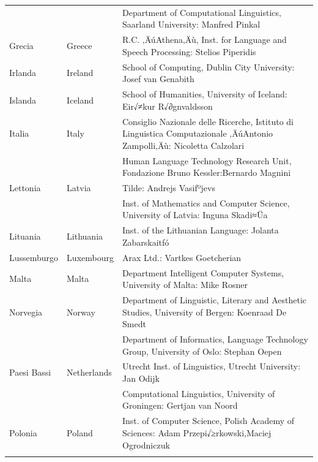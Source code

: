 \begin{longtable}{llp{110mm}}
  & & Department of Computational Linguistics, Saarland University: Manfred Pinkal\\ \addlinespace 
  Grecia & \textcolor{grey1}{Greece} & R.C. ‚ÄúAthena‚Äù, Inst. for Language and Speech Processing: Stelios Piperidis\\ \addlinespace
  Irlanda & \textcolor{grey1}{Ireland} & School of Computing, Dublin City University: Josef van Genabith\\ \addlinespace
  Islanda & \textcolor{grey1}{Iceland} & School of Humanities, University of Iceland: Eir√≠kur R√∂gnvaldsson\\ \addlinespace
  Italia & \textcolor{grey1}{Italy} & Consiglio Nazionale delle Ricerche, Istituto di Linguistica Computazionale ‚ÄúAntonio Zampolli‚Äù: Nicoletta Calzolari\\ \addlinespace
  & & Human Language Technology Research Unit, Fondazione Bruno Kessler:\newline Bernardo Magnini\\ \addlinespace 
  Lettonia & \textcolor{grey1}{Latvia} & Tilde: Andrejs Vasiƒºjevs\\ \addlinespace 
  & & Inst. of Mathematics and Computer Science, University of Latvia: Inguna Skadi≈Üa\\ \addlinespace
  Lituania & \textcolor{grey1}{Lithuania} & Inst. of the Lithuanian Language: Jolanta Zabarskaitƒó\\ \addlinespace
  Lussemburgo & \textcolor{grey1}{Luxembourg} & Arax Ltd.: Vartkes Goetcherian\\ \addlinespace
  Malta & \textcolor{grey1}{Malta} & Department Intelligent Computer Systems, University of Malta: Mike Rosner\\ \addlinespace
  Norvegia & \textcolor{grey1}{Norway} & Department of Linguistic,
  Literary and Aesthetic Studies, University of Bergen: Koenraad De Smedt\\ \addlinespace 
  & & Department of Informatics, Language Technology Group, University of Oslo: Stephan Oepen \\ \addlinespace
  Paesi Bassi & \textcolor{grey1}{Netherlands} & Utrecht Inst. of Linguistics, Utrecht University: Jan Odijk\\ \addlinespace 
  & & Computational Linguistics, University of Groningen: Gertjan van Noord\\ \addlinespace
  Polonia & \textcolor{grey1}{Poland} & Inst. of Computer Science, Polish Academy of Sciences: Adam Przepi√≥rkowski,\newline Maciej Ogrodniczuk \\ \addlinespace

\end{longtable}
